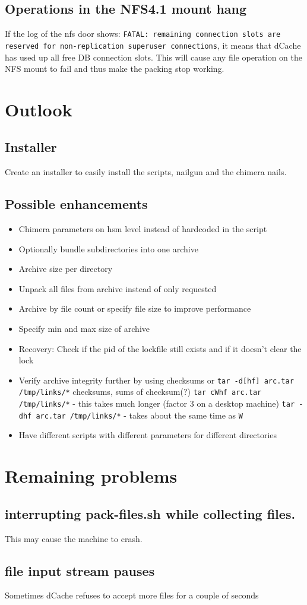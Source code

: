 \documentclass[a4paper,8pt]{scrartcl}
\begin{document}
\subsection{Operations in the NFS4.1 mount hang}
If the log of the nfs door shows: \texttt{FATAL: remaining connection slots are
reserved for non-replication superuser connections}, it means that dCache has
used up all free DB connection slots. 
This will cause any file operation on the NFS mount to fail and thus make the
packing stop working.

\section{Outlook}

\subsection{Installer}
Create an installer to easily install the scripts, nailgun and the chimera nails.

\subsection{Possible enhancements}
\begin{itemize}
  \item Chimera parameters on hsm level instead of hardcoded in the script
  \item Optionally bundle subdirectories into one archive
  \item Archive size per directory
  \item Unpack all files from archive instead of only requested
  \item Archive by file count or specify file size to improve performance
  \item Specify min and max size of archive
  \item Recovery: Check if the pid of the lockfile still exists and if it
    doesn't clear the lock
  \item Verify archive integrity further by using checksums or \texttt{tar
    -d[hf] arc.tar /tmp/links/*}
    \subitem checksums, sums of checksum(?)
    \subitem \texttt{tar cWhf arc.tar /tmp/links/*} - this takes much longer
    (factor 3 on a desktop machine)
    \subitem \texttt{tar -dhf arc.tar /tmp/links/*} - takes about the same time
    as \texttt{W}
  \item Have different scripts with different parameters for different
    directories
\end{itemize}

\section{Remaining problems}

\subsection{interrupting pack-files.sh while collecting files.}
This may cause the machine to crash.

\subsection{file input stream pauses}
Sometimes dCache refuses to accept more files for a couple of seconds
\end{document}
